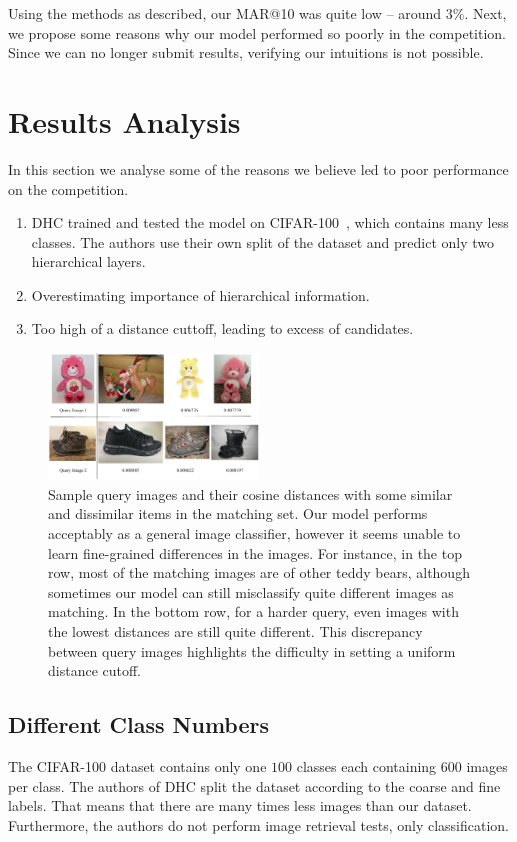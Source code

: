 \documentclass[conference]{IEEEtran}
\begin{document}
Using the methods as described, our MAR@10 was quite low -- around $3\%$.
Next, we propose some reasons why our model performed so poorly in the 
competition. 
Since we can no longer submit results, verifying our intuitions is 
not possible.

\section{Results Analysis}
In this section we analyse some of the reasons we believe led to poor performance on the 
competition.
\begin{enumerate}
		\item{DHC trained and tested the model on CIFAR-100~\cite{krizhevsky2009learning}, which
				contains many less classes. The authors use their own split of the dataset and predict
				only two hierarchical layers.
		}
		\item{Overestimating importance of hierarchical information.}
		\item{Too high of a distance cuttoff, leading to excess of candidates.}
\end{enumerate}
\begin{figure}[!t]
		\includegraphics[width=0.5\textwidth]{retrieval}
		\caption{Sample query images and their cosine distances with some similar and dissimilar items in the matching set.
				Our model performs acceptably as a general image classifier, however it seems unable to learn fine-grained differences in the images.
				For instance, in the top row, most of the matching images are
		of other teddy bears, although sometimes our model can still misclassify quite different images as matching.
		In the bottom row, for a harder query, even images with the lowest distances are still quite different.
		This discrepancy between query images highlights the difficulty in setting a uniform distance cutoff.
		}
		\label{fig:retrieval}
\end{figure}
\subsection{Different Class Numbers}
The CIFAR-100 dataset contains only one $100$ classes each containing $600$ images per class.
The authors of DHC split the dataset according to the coarse and fine labels.
That means that there are many times less images than our dataset.
Furthermore, the authors do not perform image retrieval tests, only classification.
\end{document}

